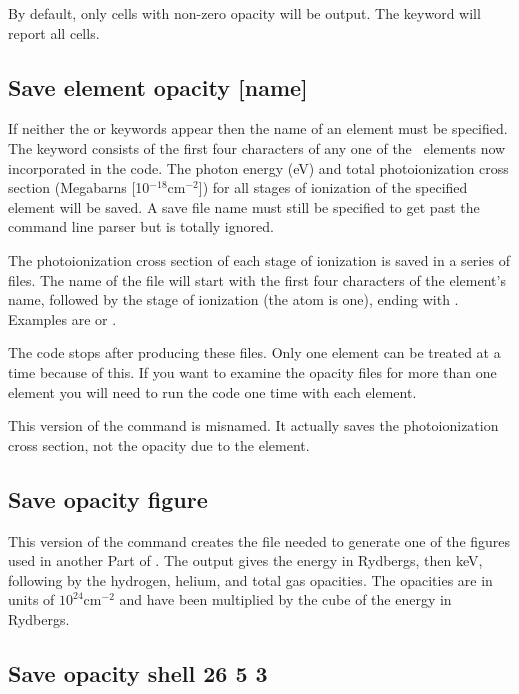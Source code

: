 By default, only cells with non-zero opacity will be output.  
The keyword  will report all cells.

\subsection{Save element opacity [name]}

If neither the  or  keywords appear then the name of an element must be specified.
The keyword consists of the first four characters of
any one of the \LIMELM\ elements now incorporated in the code.
The photon energy
(eV) and total photoionization cross section (Megabarns [10$^{-18}
\mathrm{cm}^{-2}$]) for
all stages of ionization of the specified element will be saved.
A save
file name must still be specified to get past the command line parser but
is totally ignored.

The photoionization cross section of each stage of ionization is saved
in a series of files.  The name of the file will start with the first four
characters of the element's name, followed by the stage of ionization (the
atom is one), ending with .  Examples are  or
.

The code stops after producing these files.
Only one element can be treated at a time because of this.
If you want to examine the opacity files for more than one element
you will need to run the code one time with each element.

This version of the  command is misnamed.
It actually saves the photoionization cross section, not the opacity due to the element.

\subsection{Save opacity figure}

This version of the command creates the file needed to generate one of
the figures used in another Part of \Hazy.
The output gives the energy in Rydbergs,
then keV, following by the hydrogen, helium, and total gas opacities.
The
opacities are in units of $10^{24} \mathrm{cm}^{-2}$ and have been multiplied by the cube
of the energy in Rydbergs.

\subsection{Save opacity shell 26 5 3}

